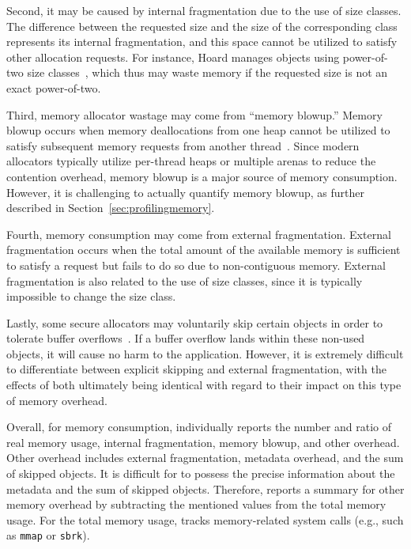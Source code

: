 Second, it may be caused by internal fragmentation due to the use of size classes.  The difference between the requested size and the size of the corresponding class represents its internal fragmentation, and this space cannot be utilized to satisfy other allocation requests. For instance, Hoard manages objects using power-of-two size classes~\cite{Hoard}, which thus may waste memory if the requested size is not an exact power-of-two. 
 
Third, memory allocator wastage may come from ``memory blowup.'' Memory blowup occurs when memory deallocations from one heap cannot be utilized to satisfy subsequent memory requests from another thread~\cite{Hoard}. 
Since modern allocators typically utilize per-thread heaps or multiple arenas to reduce the contention overhead, memory blowup is a major source of memory consumption. However, it is challenging to actually quantify memory blowup, as further described in Section~\ref{sec:profilingmemory}.   

Fourth, memory consumption may come from external fragmentation. External fragmentation occurs when the total amount of the available memory is sufficient to satisfy a request but fails to do so due to  non-contiguous memory. External fragmentation is also related to the use of size classes, 
since it is typically impossible to change the size class.  

 Lastly, some secure allocators may voluntarily skip certain objects in order to tolerate buffer overflows~\cite{DieHard, DieHarder, Guarder}. If a buffer overflow lands within these non-used objects, it will cause no harm to the application. However, it is extremely difficult to differentiate between explicit skipping and external fragmentation, with the effects of both ultimately being identical with regard to their impact on this type of memory overhead. 

Overall, for memory consumption, \MP{} individually reports the number and ratio of real memory usage, internal fragmentation, memory blowup, and other overhead. Other overhead includes external fragmentation, metadata overhead, and the sum of skipped objects. It is difficult for \MP{} to possess the precise information about the metadata and the sum of skipped objects. Therefore, \MP{} reports a summary for other memory overhead by subtracting the mentioned values from the total memory usage. For the total memory usage, \MP{} tracks memory-related system calls (e.g., such as \texttt{mmap} or \texttt{sbrk}). 


